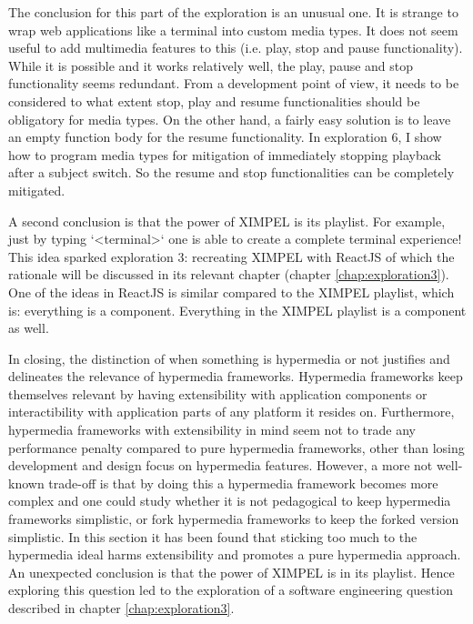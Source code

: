 The conclusion for this part of the exploration is an unusual one. It is strange to wrap web applications like a terminal into custom media types. It does not seem useful to add multimedia features to this (i.e. play, stop and pause functionality). While it is possible and it works relatively well, the play, pause and stop functionality seems redundant. From a development point of view, it needs to be considered to what extent stop, play and resume functionalities should be obligatory for media types. On the other hand, a fairly easy solution is to leave an empty function body for the resume functionality. In exploration 6, I show how to program media types for mitigation of immediately stopping playback after a subject switch. So the resume and stop functionalities can be completely mitigated.


A second conclusion is that the power of XIMPEL is its playlist. For example, just by typing `<terminal>` one is able to create a complete terminal experience! This idea sparked exploration 3: recreating XIMPEL with ReactJS of which the rationale will be discussed in its relevant chapter (chapter \ref{chap:exploration3}). One of the ideas in ReactJS is similar compared to the XIMPEL playlist, which is: everything is a component. Everything in the XIMPEL playlist is a component as well.



In closing, the distinction of when something is hypermedia or not justifies and delineates the relevance of hypermedia frameworks. Hypermedia frameworks keep themselves relevant by having extensibility with application components or interactibility with application parts of any platform it resides on. Furthermore, hypermedia frameworks with extensibility in mind seem not to trade any performance penalty compared to pure hypermedia frameworks, other than losing development and design focus on hypermedia features. However, a more not well-known trade-off is that by doing this a hypermedia framework becomes more complex and one could study whether it is not pedagogical to keep hypermedia frameworks simplistic, or fork hypermedia frameworks to keep the forked version simplistic. In this section it has been found that sticking too much to the hypermedia ideal harms extensibility and promotes a pure hypermedia approach. An unexpected conclusion is that the power of XIMPEL is in its playlist. Hence exploring this question led to the exploration of a software engineering question described in chapter \ref{chap:exploration3}.

